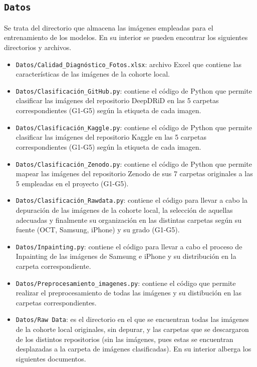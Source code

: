 \subsection{\texttt{Datos}}

Se trata del directorio que almacena las imágenes empleadas para el entrenamiento de los modelos. En su interior se pueden encontrar los siguientes directorios y archivos.

\begin{itemize}
    \item \texttt{Datos/Calidad\_Diagnóstico\_Fotos.xlsx}: archivo Excel que contiene las características de las imágenes de la cohorte local.
    \item \texttt{Datos/Clasificación\_GitHub.py}: contiene el código de Python que permite clasificar las imágenes del repositorio DeepDRiD en las 5 carpetas correspondientes (G1-G5) según la etiqueta de cada imagen.
    \item \texttt{Datos/Clasificación\_Kaggle.py}: contiene el código de Python que permite clasificar las imágenes del repositorio Kaggle en las 5 carpetas correspondientes (G1-G5) según la etiqueta de cada imagen.
    \item \texttt{Datos/Clasificación\_Zenodo.py}: contiene el código de Python que permite mapear las imágenes del repositorio Zenodo de sus 7 carpetas originales a las 5 empleadas en el proyecto (G1-G5).
    \item \texttt{Datos/Clasificación\_Rawdata.py}: contiene el código para llevar a cabo la depuración de las imágenes de la cohorte local, la selección de aquellas adecuadas y finalmente su organización en las distintas carpetas según su fuente (OCT, Samsung, iPhone) y su grado (G1-G5).
    \item \texttt{Datos/Inpainting.py}: contiene el código para llevar a cabo el proceso de Inpainting de las imágenes de Samsung e iPhone y su distribución en la carpeta correspondiente.
    \item \texttt{Datos/Preprocesamiento\_imagenes.py}: contiene el código que permite realizar el preprocesamiento de todas las imágenes y su distibución en las carpetas correspondientes.
    \item \texttt{Datos/Raw Data}: es el directorio en el que se encuentran todas las imágenes de la cohorte local originales, sin depurar, y las carpetas que se descargaron de los distintos repositorios (sin las imágenes, pues estas se encuentran desplazadas a la carpeta de imágenes clasificadas). En su interior alberga los siguientes documentos.

\end{itemize}

